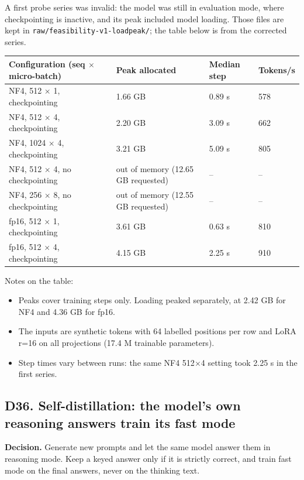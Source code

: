 \documentclass[11pt,a4paper]{article}
\newcommand{\code}[1]{\texttt{#1}}
\begin{document}
A first probe series was invalid: the model was still in evaluation mode, where checkpointing is inactive, and its peak included model loading. Those files are kept in \code{raw/feasibility-v1-loadpeak/}; the table below is from the corrected series.

\begin{table}[H]\centering\small
\begin{tabularx}{\textwidth}{@{}Ylll@{}}
\toprule
Configuration (seq $\times$ micro-batch) & Peak allocated & Median step & Tokens/s \\
\midrule
NF4, 512 $\times$ 1, checkpointing & 1.66 GB & 0.89 s & 578 \\
NF4, 512 $\times$ 4, checkpointing & 2.20 GB & 3.09 s & 662 \\
NF4, 1024 $\times$ 4, checkpointing & 3.21 GB & 5.09 s & 805 \\
NF4, 512 $\times$ 4, no checkpointing & out of memory (12.65 GB requested) & -- & -- \\
NF4, 256 $\times$ 8, no checkpointing & out of memory (12.55 GB requested) & -- & -- \\
fp16, 512 $\times$ 1, checkpointing & 3.61 GB & 0.63 s & 810 \\
fp16, 512 $\times$ 4, checkpointing & 4.15 GB & 2.25 s & 910 \\
\bottomrule\end{tabularx}\end{table}

Notes on the table:

\begin{itemize}
\item Peaks cover training steps only. Loading peaked separately, at 2.42 GB for NF4 and 4.36 GB for fp16.
\item The inputs are synthetic tokens with 64 labelled positions per row and LoRA r=16 on all projections (17.4 M trainable parameters).
\item Step times vary between runs: the same NF4 512$\times$4 setting took 2.25 s in the first series.
\end{itemize}

\subsection{D36. Self-distillation: the model's own reasoning answers train its fast mode}

\textbf{Decision.} Generate new prompts and let the same model answer them in reasoning mode. Keep a keyed answer only if it is strictly correct, and train fast mode on the final answers, never on the thinking text.
\end{document}
